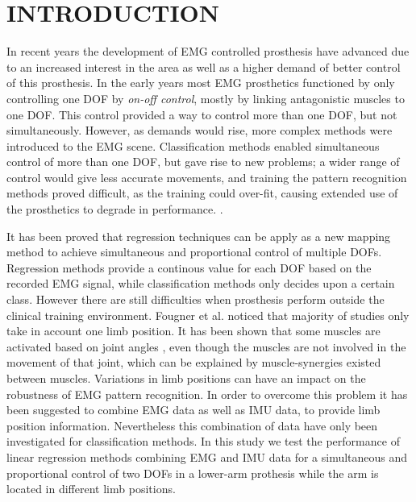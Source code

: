 \documentclass[a4paper, 10pt, conference]{ieeeconf}      %
\begin{document}
	
	\section{INTRODUCTION}
In recent years the development of EMG controlled prosthesis have advanced due to an increased interest in the area as well as a higher demand of better control of this prosthesis.\cite{fougner2012}
In the early years most EMG prosthetics functioned by only controlling one DOF by \textit{on-off control}, mostly by linking antagonistic muscles to one DOF. %
This control provided a way to control more than one DOF, but not simultaneously. However, as demands would rise, more complex methods were introduced to the EMG scene. Classification methods enabled simultaneous control of more than one DOF, but gave rise to new problems; a wider range of control would give less accurate movements, and training the pattern recognition methods proved difficult, as the training could over-fit, causing extended use of the prosthetics to degrade in performance. \cite{Ison2016}.
 
It has been proved that regression techniques can be apply as a new mapping method to achieve simultaneous and proportional control of multiple DOFs\cite{hanhe2014}. Regression methods provide a continous value for each DOF based on the recorded EMG signal, while classification methods only decides upon a certain class. However there are still difficulties when prosthesis perform outside the clinical training environment\cite{jiang2012}.
 Fougner et al.\cite{Fougner2011} noticed that majority of studies only take in account one limb position. It has been shown that some muscles are activated based on joint angles \cite{reference}, even though the muscles are not involved in the movement of that joint, which can be explained by muscle-synergies existed between muscles.
Variations in limb positions can have an impact on the robustness of EMG pattern recognition. %
In order to overcome this problem it has been suggested to combine EMG data as well as IMU data, to provide limb position information. Nevertheless this combination of data have only been investigated for classification methods. 
In this study we test the performance of linear regression methods combining EMG and IMU data for a simultaneous and proportional control of two DOFs in a lower-arm prothesis while the arm is located in different limb positions.
	
\end{document}
